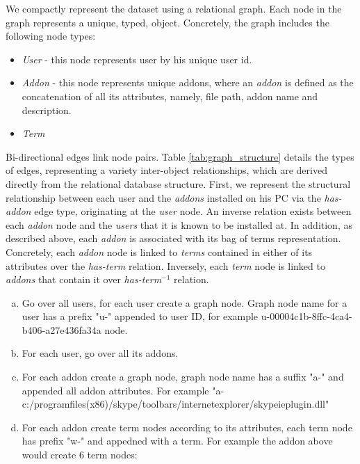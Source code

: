 \documentclass[11pt,oneside]{book}
\begin{document}
We compactly represent the dataset using a relational graph. Each node in the graph represents a unique, typed,  object.  Concretely, the graph includes the following node types:
\begin{itemize}
\renewcommand{\labelitemi}{$\bullet$} 
\item {\it User} - this node represents user by his unique user id. 
\item {\it Addon} - this node represents unique addons, where an {\it addon} is defined as the concatenation of all its attributes, namely, file path, addon name and description.
\item {\it Term} 
\end{itemize}
Bi-directional edges link node pairs.
Table \ref{tab:graph_structure} details the types of edges, representing a variety inter-object relationships, which are derived directly from the relational database structure.
First, we represent the structural relationship between each user and the {\it addons} installed on his PC via the {\it has-addon} edge type, originating at the {\it user} node. An inverse relation exists between each {\it addon} node and the {\it users} that it is known to be installed at. 
In addition, as described above, each {\it addon} is associated with its bag of terms representation. Concretely, each {\it addon} node is linked to {\it terms} contained in either of its attributes over the {\it has-term} relation. Inversely, each {\it term} node is linked to {\it addons} that contain it over {\it has-term$^{-1}$} relation.



\iffalse
\begin{small}
\begin{enumerate}[(a)]
\item Go over all users, for each user create a graph node. Graph node name for a user has a prefix "u-" appended to user ID, for example u-00004c1b-8ffc-4ca4-b406-a27e436fa34a node.

\item For each user, go over all its addons.
\item For each addon create a graph node, graph node name has a suffix "a-" and appended all addon attributes. For example "a-c:/programfiles(x86)/skype/toolbars/internetexplorer/skypeieplugin.dll"
\item For each addon create term nodes according to its attributes, each term node has prefix "w-" and appedned with a term. For example the addon above would create 6 term nodes:
\end{enumerate}
\end{small}
\end{document}
